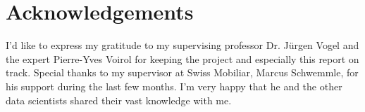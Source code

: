 \section{Acknowledgements}

I'd like to express my gratitude to my supervising professor Dr. Jürgen Vogel and the expert Pierre-Yves Voirol for keeping the project and especially this report on track. Special thanks to my supervisor at Swiss Mobiliar, Marcus Schwemmle, for his support during the last few months. I'm very happy that he and the other data scientists shared their vast knowledge with me.
